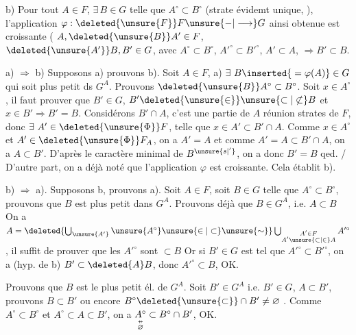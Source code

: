 b) Pour tout $A\in F$, $\exists\,B\in G$ telle que $A^\circ\subset B^\circ$ (strate évidemt unique, ), l'application $\varphi:\deleted{\unsure{F}}F\unsure{-|\longrightarrow}G$ ainsi obtenue est croissante (
   $A,\deleted{\unsure{B}}A'\in F$, $\deleted{\unsure{A'}}B,B'\in G$,  avec $A^\circ\subset B^\circ$, $A'^\circ\subset B'^\circ$, $A'\subset A$, $\Longrightarrow B'\subset B$.

a) $\Longrightarrow$ b) Supposons a) prouvons b). Soit $A\in F$,  a) $\exists\ B\inserted{{}=\varphi(A)}\in G$  qui soit plus petit ds $G^A$. Prouvons $\deleted{\unsure{B}}A^\circ\subset B^\circ$. Soit
$x\in A^\circ$, il faut prouver que $B'\in G$, $B'\deleted{\unsure{\in}}\unsure{\subset|\not\subset} B$ et $x\in B'\Longrightarrow B'=B$.  Considérons $B'\cap A$, c'est une partie de $A$ réunion  strates de $F$,
donc $\exists\ A'\in\deleted{\unsure{\Phi}}F$, telle que $x\in A'\subset B'\cap A$. Comme $x\in A^\circ$ et $A'\in\deleted{\unsure{\Phi}}F_A$, on a $A'=A$ et comme $A'=A\subset B'\cap A$, on a $A\subset B'$. D'après le caractère minimal de
$B^{\unsure{s|'}}$, on a donc $B'=B$ qed. / D'autre part, on a déjà noté que l'application $\varphi$ est croissante. Cela établit b).

b) $\Longrightarrow$ a). Supposons b, prouvons a). Soit $A\in F$, soit $B\in G$ telle que $A^\circ\subset B^\circ$, prouvons que $B$ est plus petit  dans $G^A$.
Prouvons déjà que $B\in G^A$, i.e. $A\subset B$ 
 On a $A=\deleted{\bigcup_{\unsure{A'}}\unsure{A^\circ}\unsure{\in|\subset}\unsure{\sim}}\bigcup_{\substack{A'\in F\\ A'\unsure{\subset|\in} A}} A'^\circ$,  il suffit de prouver que les $A'^\circ$ sont $\subset B$
Or si $B'\in G$ est tel que $A'^\circ\subset B'^\circ$, on a  (hyp. de b) $B'\subset \deleted{A}B$, donc $A'^\circ\subset B$, OK.

Prouvons que $B$ est le plus petit él. de $G^A$. Soit $B'\in G^A$ i.e. $B'\in G$, $A\subset B'$, prouvons $B\subset B'$ ou encore $B^\circ\deleted{\unsure{\subset}}\cap B'\ne\varnothing$ . Comme
$A^\circ\subset B^\circ$ et $A^\circ\subset A\subset B'$, on a $\underset{\substack{\mathrel{\ooalign{\hfil$\scriptstyle\shortparallel$\hfil\cr\hfil$\scriptstyle-$\hfil\cr}}\\ \varnothing}}{A^\circ}\subset B^\circ\cap B'$, OK.

